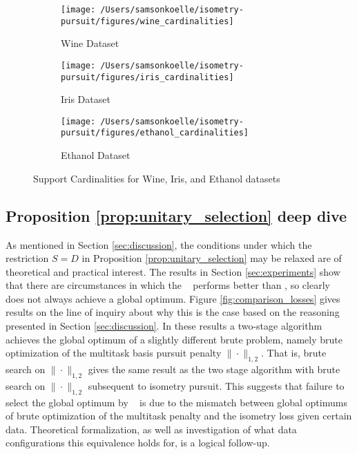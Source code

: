 \begin{figure}[t]
    \centering
    \begin{subfigure}[b]{0.3\textwidth}
        \centering
        \texttt{[image: /Users/samsonkoelle/isometry-pursuit/figures/wine\_cardinalities]}
        \caption{Wine Dataset}
        \label{fig:wine_cardinalities}
    \end{subfigure}
    \hfill
    \begin{subfigure}[b]{0.3\textwidth}
        \centering
        \texttt{[image: /Users/samsonkoelle/isometry-pursuit/figures/iris\_cardinalities]}
        \caption{Iris Dataset}
        \label{fig:iris_cardinalities}
    \end{subfigure}
    \hfill
    \begin{subfigure}[b]{0.3\textwidth}
        \centering
        \texttt{[image: /Users/samsonkoelle/isometry-pursuit/figures/ethanol\_cardinalities]}
        \caption{Ethanol Dataset}
        \label{fig:ethanol_cardinalities}
    \end{subfigure}
    \caption{Support Cardinalities for Wine, Iris, and Ethanol datasets}
    \label{fig:support_cardinalities}
\end{figure}

\newpage

\subsection{Proposition \ref{prop:unitary_selection} deep dive}
\label{sec:deep_dive}

As mentioned in Section \ref{sec:discussion}, the conditions under which the restriction $S=D$ in Proposition \ref{prop:unitary_selection} may be relaxed are of theoretical and practical interest.
The results in Section \ref{sec:experiments} show that there are circumstances in which the \greedy~ performs better than \tsip, so clearly \tsip~ does not always achieve a global optimum.
Figure \ref{fig:comparison_losses} gives results on the line of inquiry about why this is the case based on the reasoning presented in Section \ref{sec:discussion}.
In these results a two-stage algorithm achieves the global optimum of a slightly different brute problem, namely brute optimization of the multitask basis pursuit penalty $\|\cdot \|_{1,2}$.
That is, brute search on $\|\cdot \|_{1,2}$ gives the same result as the two stage algorithm with brute search on $\|\cdot \|_{1,2}$ subsequent to isometry pursuit.
This suggests that failure to select the global optimum by \tsip~ is due to the mismatch between global optimums of brute optimization of the multitask penalty and the isometry loss given certain data.
Theoretical formalization, as well as investigation of what data configurations this equivalence holds for, is a logical follow-up.

